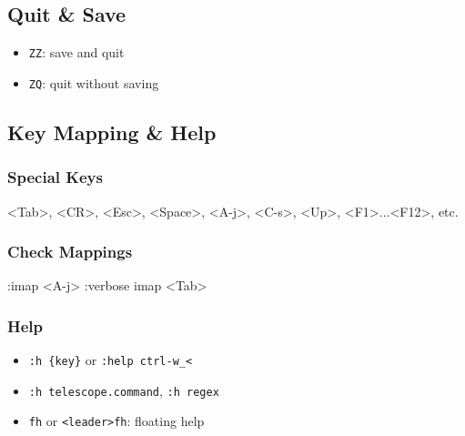 \documentclass[
  letterpaper,
  DIV=11,
  numbers=noendperiod]{scrartcl}
\newenvironment{Shaded}{}{}
\newcommand{\NormalTok}[1]{\textcolor[rgb]{0.22,0.23,0.26}{#1}}
\providecommand{\tightlist}{%
  \setlength{\itemsep}{0pt}\setlength{\parskip}{0pt}}\usepackage{longtable,booktabs,array}
\begin{document}
\subsection{Quit \& Save}\label{quit-save}

\begin{itemize}
\tightlist
\item
  \texttt{ZZ}: save and quit
\item
  \texttt{ZQ}: quit without saving
\end{itemize}

\subsection{Key Mapping \& Help}\label{key-mapping-help}

\subsubsection{Special Keys}\label{special-keys}

\begin{Shaded}
\begin{Highlighting}[]
\NormalTok{\textless{}Tab\textgreater{}, \textless{}CR\textgreater{}, \textless{}Esc\textgreater{}, \textless{}Space\textgreater{}, \textless{}A{-}j\textgreater{}, \textless{}C{-}s\textgreater{}, \textless{}Up\textgreater{}, \textless{}F1\textgreater{}...\textless{}F12\textgreater{}, etc.}
\end{Highlighting}
\end{Shaded}

\subsubsection{Check Mappings}\label{check-mappings}

\begin{Shaded}
\begin{Highlighting}[]
\NormalTok{:imap \textless{}A{-}j\textgreater{}}
\NormalTok{:verbose imap \textless{}Tab\textgreater{}}
\end{Highlighting}
\end{Shaded}

\subsubsection{Help}\label{help}

\begin{itemize}
\tightlist
\item
  \texttt{:h\ \{key\}} or \texttt{:help\ ctrl-w\_\textless{}}
\item
  \texttt{:h\ telescope.command}, \texttt{:h\ regex}
\item
  \texttt{fh} or \texttt{\textless{}leader\textgreater{}fh}: floating
  help
\end{itemize}
\end{document}
